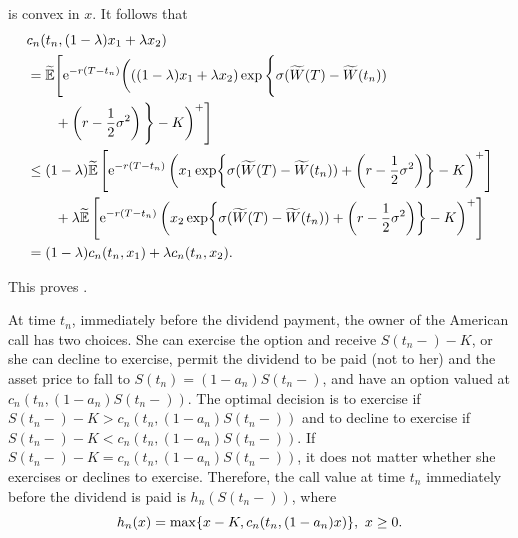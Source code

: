 is convex in $x$. It follows that
\begin{align}
	 & c_n(t_n, (1 - \lambda)x_1 + \lambda x_2) \nonumber                                                                                                                                                           \\
	 & = \widetilde{\E} \Bigg[ \e^{-r(T-t_n)} \bigg( ((1 - \lambda)x_1 + \lambda x_2) \exp\Bigg\{ \sigma (\widetilde{W}(T) - \widetilde{W}(t_n)) \nonumber                                                          \\
	 & \qquad + \left( r - \frac{1}{2}\sigma^2 \right) \Bigg\} - K \bigg)^+ \Bigg] \nonumber                                                                                                                        \\
	 & \le (1 - \lambda)\widetilde{\E} \left[ \e^{-r(T-t_n)} \left( x_1 \exp \set[\bigg]{ \sigma (\widetilde{W}(T) - \widetilde{W}(t_n)) + \left( r - \frac{1}{2}\sigma^2 \right) } - K \right)^+ \right] \nonumber \\
	 & \qquad + \lambda\widetilde{\E} \left[ \e^{-r(T-t_n)} \left( x_2 \exp \set[\bigg]{ \sigma (\widetilde{W}(T) - \widetilde{W}(t_n)) + \left( r - \frac{1}{2}\sigma^2 \right) } - K \right)^+ \right] \nonumber  \\
	 & = (1 - \lambda)c_n(t_n, x_1) + \lambda c_n(t_n, x_2). \label{eq:ConvexityProof}
\end{align}

This proves .

At time $t_n$, immediately before the dividend payment, the owner of the American call has two choices. She can exercise the option and receive $S(t_n-) - K$, or she can decline to exercise, permit the dividend to be paid (not to her) and the asset price to fall to $S(t_n) = (1 - a_n)S(t_n-)$, and have an option valued at $c_n(t_n, (1 - a_n)S(t_n-))$. The optimal decision is to exercise if $S(t_n-) - K > c_n(t_n, (1 - a_n)S(t_n-))$ and to decline to exercise if $S(t_n-) - K < c_n(t_n, (1 - a_n)S(t_n-))$. If $S(t_n-) - K = c_n(t_n, (1 - a_n)S(t_n-))$, it does not matter whether she exercises or declines to exercise. Therefore, the call value at time $t_n$ immediately before the dividend is paid is $h_n(S(t_n-))$, where
\begin{equation}
	h_n(x) = \max \set{ x - K, c_n(t_n, (1 - a_n)x) }, \ x \ge 0. \label{eq:ValueFunctionHn}
\end{equation}

